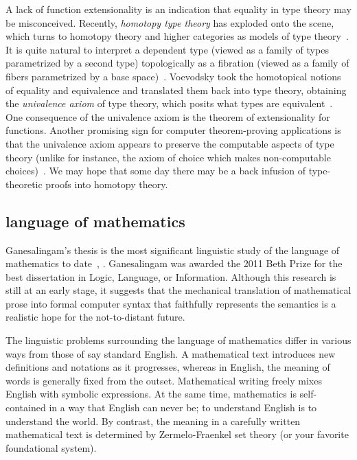 \documentclass{llncs}
\begin{document}
A lack of function extensionality is an indication
that equality in type theory may be misconceived. Recently, {\it
  homotopy type theory} has exploded onto the scene, which turns to
homotopy theory and higher categories as models of type
theory~\cite{htt}.  It is quite natural to interpret a dependent type
(viewed as a family of types parametrized by a second type)
topologically as a fibration (viewed as a family of fibers
parametrized by a base space)~\cite{AW09}. Voevodsky took the
homotopical notions of equality and equivalence and translated them
back into type theory, obtaining the {\it univalence axiom} of type
theory, which posits what types are equivalent~\cite{VV11}.  One
consequence of the univalence axiom is the theorem of extensionality
for functions.  Another promising sign for computer theorem-proving
applications is that the univalence axiom appears to preserve the
computable aspects of type theory (unlike for instance, the axiom of
choice which makes non-computable choices)~\cite{LH11}.  We may hope
that some day there may be a back infusion of type-theoretic proofs
into homotopy theory.


\subsection{language of mathematics}


Ganesalingam's thesis is the most significant linguistic study of the
language of mathematics to date~\cite{Gan09}, \cite{Gan10}.
Ganesalingam was awarded the 2011 Beth Prize for the best dissertation
in Logic, Language, or Information.  Although this research is still
at an early stage, it suggests that the mechanical translation of
mathematical prose into formal computer syntax that faithfully
represents the semantics is a realistic hope for the not-to-distant
future.


The linguistic problems surrounding the language of mathematics differ
in various ways from those of say standard English.  A mathematical
text introduces new definitions and notations as it progresses,
whereas in English, the meaning of words is generally fixed from the
outset.  Mathematical writing freely mixes English with symbolic
expressions.  At the same time, mathematics is self-contained in a way
that English can never be; to understand English is to understand the
world.  By contrast, the meaning in a carefully written mathematical
text is determined by Zermelo-Fraenkel set theory (or your favorite
foundational system).
\end{document}
